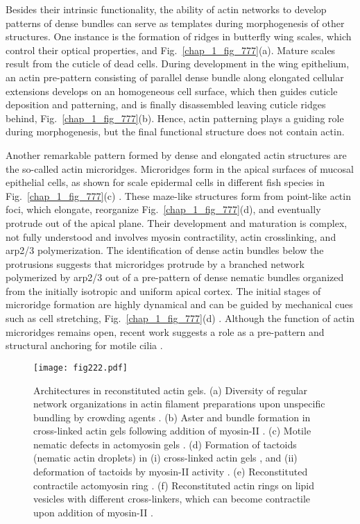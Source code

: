 Besides their intrinsic functionality, the ability of actin networks to develop patterns of dense bundles can serve as templates during morphogenesis of other structures. One instance is the formation of ridges in butterfly wing scales, which control their optical properties, \cite{DINWIDDIE2014404} and Fig.~\ref{chap_1_fig_777}(a). Mature scales result from the cuticle of dead cells. During development in the wing epithelium, an actin pre-pattern consisting of parallel dense bundle along elongated cellular extensions develops on an homogeneous cell surface, which then guides cuticle deposition and patterning, and is finally disassembled leaving cuticle ridges behind, Fig.~\ref{chap_1_fig_777}(b). Hence, actin patterning plays a guiding role during morphogenesis, but the final functional structure does not contain actin.   

Another remarkable pattern formed by dense and elongated actin structures are the so-called actin microridges. Microridges form in the apical surfaces of mucosal epithelial cells, as shown for scale epidermal cells in different fish species in Fig.~\ref{chap_1_fig_777}(c) \cite{https://doi.org/10.1002/ar.23965}. These maze-like structures form from point-like actin foci, which elongate, reorganize Fig.~\ref{chap_1_fig_777}(d), and eventually protrude out of the apical plane. Their development and maturation is complex, not fully understood and involves myosin contractility, actin crosslinking, and arp2/3 polymerization. The identification of dense actin bundles below the protrusions \cite{BEREITERHAHN1979316} suggests that microridges protrude by a branched network polymerized by arp2/3 out of a pre-pattern of dense nematic bundles organized from the initially isotropic and uniform apical cortex. The initial stages of microridge formation are highly dynamical and can be guided by mechanical cues such as cell stretching, Fig.~\ref{chap_1_fig_777}(d) \cite{10.1083/jcb.201904144}. Although the function of actin microridges remains open, recent work suggests a role as a pre-pattern and structural anchoring for motile cilia \cite{Yasunaga:2022uh}. 


\begin{figure}
	\centering
	\texttt{[image: fig222.pdf]}
	\caption{\label{chap_1_fig_222} Architectures in reconstituted actin gels. (a) Diversity of regular network organizations in actin filament preparations upon unspecific bundling by crowding agents \cite{huber20152}. (b) Aster and bundle formation in cross-linked actin gels following addition of myosin-II \cite{murrell2012}. (c) Motile nematic defects in actomyosin gels \cite{seara2018}. (d) Formation of tactoids (nematic actin droplets) in (i) cross-linked actin gels \cite{weirich2017}, and (ii) deformation of tactoids by myosin-II activity \cite{weirich2019}. (e) Reconstituted contractile actomyosin ring \cite{Ennomani2016}. (f) Reconstituted actin rings on lipid vesicles with different cross-linkers, which can become contractile upon addition of myosin-II  \cite{litschel2021}.}
\end{figure}


